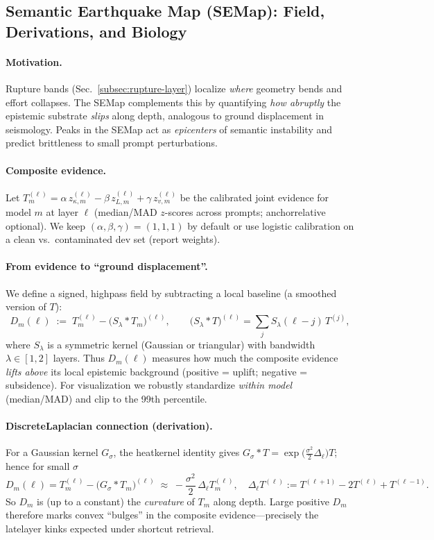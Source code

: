 \documentclass[11pt]{article}
\begin{document}
\vspace{0.5em}
\subsection{Semantic Earthquake Map (SE\textendash Map): Field, Derivations, and Biology}
\label{subsec:semantic-earthquake}

\paragraph{Motivation.}
Rupture bands (Sec.~\ref{subsec:rupture-layer}) localize \emph{where} geometry bends and effort collapses. The SE\textendash Map complements this by quantifying \emph{how abruptly} the epistemic substrate \emph{slips} along depth, analogous to ground displacement in seismology. Peaks in the SE\textendash Map act as \emph{epicenters} of semantic instability and predict brittleness to small prompt perturbations.

\paragraph{Composite evidence.}
Let $T_m^{(\ell)}=\alpha\,z_{\kappa,m}^{(\ell)}-\beta\,z_{L,m}^{(\ell)}+\gamma\,z_{v,m}^{(\ell)}$ be the calibrated joint evidence for model $m$ at layer $\ell$ (median/MAD $z$-scores across prompts; anchor\textendash relative optional). We keep $(\alpha,\beta,\gamma)=(1,1,1)$ by default or use logistic calibration on a clean vs.\ contaminated dev set (report weights).

\paragraph{From evidence to ``ground displacement''.}
We define a signed, high\textendash pass field by subtracting a local baseline (a smoothed version of $T$):
\[
D_m(\ell)\;:=\;T_m^{(\ell)}-\big(S_\lambda*T_m\big)^{(\ell)},\qquad
\big(S_\lambda*T\big)^{(\ell)}=\sum_{j}S_\lambda(\ell-j)\,T^{(j)},
\]
where $S_\lambda$ is a symmetric kernel (Gaussian or triangular) with bandwidth $\lambda\in[1,2]$ layers. Thus $D_m(\ell)$ measures how much the composite evidence \emph{lifts above} its local epistemic background (positive = uplift; negative = subsidence). For visualization we robustly standardize \emph{within model} (median/MAD) and clip to the 99th percentile.

\paragraph{Discrete\textendash Laplacian connection (derivation).}
For a Gaussian kernel $G_\sigma$, the heat\textendash kernel identity gives $G_\sigma*T=\exp\!\big(\tfrac{\sigma^2}{2}\Delta_\ell\big)T$; hence for small $\sigma$
\[
D_m(\ell)=T_m^{(\ell)}-\big(G_\sigma*T_m\big)^{(\ell)}
\;\approx\;-\frac{\sigma^2}{2}\,\Delta_\ell T_m^{(\ell)},\quad
\Delta_\ell T^{(\ell)}:=T^{(\ell+1)}-2T^{(\ell)}+T^{(\ell-1)}.
\]
So $D_m$ is (up to a constant) the \emph{curvature} of $T_m$ along depth. Large positive $D_m$ therefore marks convex ``bulges'' in the composite evidence—precisely the late\textendash layer kinks expected under shortcut retrieval.
\end{document}
